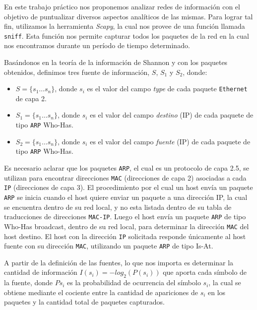 En este trabajo práctico nos proponemos analizar redes de información con el objetivo de puntualizar diversos aspectos analíticos de las mismas. Para lograr tal fin, utilizamos la herramienta \textit{Scapy}, la cual nos provee de una función llamada \texttt{sniff}. Esta función nos permite capturar todos los paquetes de la red en la cual nos encontramos durante un período de tiempo determinado.

Basándonos en la teoría de la información de Shannon y con los paquetes obtenidos, definimos tres fuente de información, $S$, $S_{1}$ y $S_{2}$, donde:

\begin{itemize}
  \item $S = \{s_{1} \dots s_{n}\}$, donde $s_{i}$ es el valor del campo \emph{type} de cada paquete \texttt{Ethernet} de capa 2.
  \item $S_{1} = \{s_{1} \dots s_{n}\} $, donde $s_i$ es el valor del campo \emph{destino} (IP) de cada paquete de
  tipo \texttt{ARP} Who-Has.
  \item $S_{2} = \{s_{1} \dots s_{n}\} $, donde $s_i$ es el valor del campo \emph{fuente} (IP) de cada paquete de
  tipo \texttt{ARP} Who-Has.
\end{itemize}

Es necesario aclarar que los paquetes \texttt{ARP}, el cual es un protocolo de capa 2.5, se utilizan para encontrar direcciones \texttt{MAC} (direcciones de capa 2) asociadas a cada \texttt{IP} (direcciones de capa 3). El procedimiento por el cual un host envía un paquete \texttt{ARP} se inicia cuando el host quiere enviar un paquete a una dirección IP, la cual se encuentra dentro de su red local, y no esta listada dentro de su tabla de traducciones de direcciones \texttt{MAC-IP}. Luego el host envía un paquete \texttt{ARP} de tipo Who-Has broadcast, dentro de su red local, para determinar la dirección \texttt{MAC} del host destino. El host con la dirección \texttt{IP} solicitada responde únicamente al host fuente con su dirección \texttt{MAC}, utilizando un paquete \texttt{ARP} de tipo Is-At.

A partir de la definición de las fuentes, lo que nos importa es determinar la cantidad de información $I(s_{i}) = -log_2(P(s_{i}))$ que aporta cada símbolo de la fuente, donde $Ps_{i}$ es la probabilidad de ocurrencia del símbolo $s_{i}$, la cual se obtiene mediante el cociente entre la cantidad de apariciones de $s_{i}$ en los paquetes y la cantidad total de paquetes capturados.

